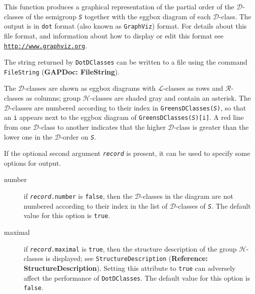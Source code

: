 \documentclass[a4paper,11pt]{report}
\begin{document}
{{{ This function produces a graphical representation of the partial order of the $\mathcal{D}$-classes of the semigroup \mbox{\texttt{\mdseries\slshape S}} together with the eggbox diagram of each $\mathcal{D}$-class. The output is in \texttt{dot} format (also known as \texttt{GraphViz}) format. For details about this file format, and information about how to
display or edit this format see \href{http://www.graphviz.org} {\texttt{http://www.graphviz.org}}. 

 The string returned by \texttt{DotDClasses} can be written to a file using the command \texttt{FileString} (\textbf{GAPDoc: FileString}).

 The $\mathcal{D}$-classes are shown as eggbox diagrams with $\mathcal{L}$-classes as rows and $\mathcal{R}$-classes as columns; group $\mathcal{H}$-classes are shaded gray and contain an asterisk. The $\mathcal{D}$-classes are numbered according to their index in \texttt{GreensDClasses(\mbox{\texttt{\mdseries\slshape S}})}, so that an \texttt{i} appears next to the eggbox diagram of \texttt{GreensDClasses(\mbox{\texttt{\mdseries\slshape S}})[i]}. A red line from one $\mathcal{D}$-class to another indicates that the higher $\mathcal{D}$-class is greater than the lower one in the $\mathcal{D}$-order on \mbox{\texttt{\mdseries\slshape S}}. 

 If the optional second argument \mbox{\texttt{\mdseries\slshape record}} is present, it can be used to specify some options for output. 
\begin{description}
\item[{number}]  if \texttt{\mbox{\texttt{\mdseries\slshape record}}.number} is \texttt{false}, then the $\mathcal{D}$-classes in the diagram are not numbered according to their index in the list
of $\mathcal{D}$-classes of \mbox{\texttt{\mdseries\slshape S}}. The default value for this option is \texttt{true}. 
\item[{maximal}]  if \texttt{\mbox{\texttt{\mdseries\slshape record}}.maximal} is \texttt{true}, then the structure description of the group $\mathcal{H}$-classes is displayed; see \texttt{StructureDescription} (\textbf{Reference: StructureDescription}). Setting this attribute to \texttt{true} can adversely affect the performance of \texttt{DotDClasses}. The default value for this option is \texttt{false}. 
\end{description}
 
}}}
\end{document}
